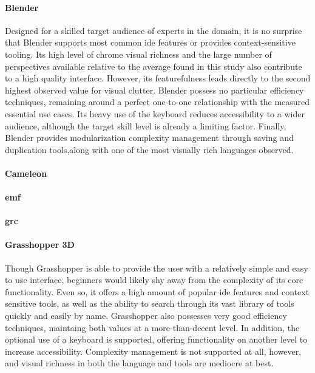 \paragraph{Blender} Designed for a skilled target audience of experts in
the domain, it is no surprise that Blender supports most common \ac{ide}
features or provides context-sensitive tooling. Its high level of chrome
visual richness and the large number of perspectives available relative to
the average found in this study also contribute to a high quality
interface. However, its featurefulness leads directly to the second highest
observed value for visual clutter. Blender possess no particular efficiency
techniques, remaining around a perfect one-to-one relationship with the
measured essential use cases. Its heavy use of the keyboard reduces
accessibility to a wider audience, although the target skill level is
already a limiting factor. Finally, Blender provides modularization
complexity management through saving and duplication tools,along with one
of the most visually rich languages observed.

\paragraph{Cameleon}

\paragraph{\acl{emf}}

\paragraph{\acl{grc}}

\paragraph{Grasshopper 3D} Though Grasshopper is able to provide the user with a relatively simple and easy to use interface, beginners would likely shy away from the complexity of its core functionality. Even so, it offers a high amount of popular \ac{ide} features and context sensitive tools, as well as the ability to search through its vast library of tools quickly and easily by name. Grasshopper also possesses very good efficiency techniques, maintaing both values at a more-than-decent level. In addition, the optional use of a keyboard is supported, offering functionality on another level to increase accessibility. Complexity management is not supported at all, however, and visual richness in both the language and tools are mediocre at best.

